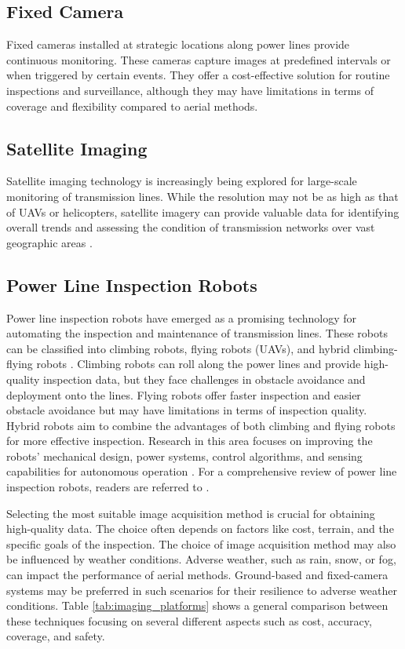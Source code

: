 \subsection{Fixed Camera}
Fixed cameras installed at strategic locations along power lines provide continuous monitoring. These cameras capture images at predefined intervals or when triggered by certain events. They offer a cost-effective solution for routine inspections and surveillance, although they may have limitations in terms of coverage and flexibility compared to aerial methods.

\subsection{Satellite Imaging}
Satellite imaging technology is increasingly being explored for large-scale monitoring of transmission lines. While the resolution may not be as high as that of UAVs or helicopters, satellite imagery can provide valuable data for identifying overall trends and assessing the condition of transmission networks over vast geographic areas \cite{zhou_insulator_2023}. 

\subsection{Power Line Inspection Robots}
Power line inspection robots have emerged as a promising technology for automating the inspection and maintenance of transmission lines. These robots can be classified into climbing robots, flying robots (UAVs), and hybrid climbing-flying robots \cite{alhassan2020power}. Climbing robots can roll along the power lines and provide high-quality inspection data, but they face challenges in obstacle avoidance and deployment onto the lines. Flying robots offer faster inspection and easier obstacle avoidance but may have limitations in terms of inspection quality. Hybrid robots aim to combine the advantages of both climbing and flying robots for more effective inspection. Research in this area focuses on improving the robots' mechanical design, power systems, control algorithms, and sensing capabilities for autonomous operation \cite{chen2021environment}. For a comprehensive review of power line inspection robots, readers are referred to \cite{alhassan2020power, chen2021environment, ekren2024review}.

Selecting the most suitable image acquisition method is crucial for obtaining high-quality data. The choice often depends on factors like cost, terrain, and the specific goals of the inspection. The choice of image acquisition method may also be influenced by weather conditions. Adverse weather, such as rain, snow, or fog, can impact the performance of aerial methods. Ground-based and fixed-camera systems may be preferred in such scenarios for their resilience to adverse weather conditions. Table \ref{tab:imaging_platforms} shows a general comparison between these techniques focusing on several different aspects such as cost, accuracy, coverage, and safety. 

